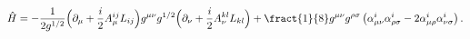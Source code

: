 \begin{equation}
\hat{H} = -\frac{1}{2g^{1/2}}\Bigl(\partial_{\mu} + \frac{i}{2}A^{ij}_{\mu}L_{ij}
\Bigr)g^{\mu\nu}g^{1/2}\Bigl(\partial_{\nu} + \frac{i}{2}A^{kl}_{\nu}L_{kl} \Bigr) +
\fract{1}{8}g^{\mu\nu}g^{\rho\sigma}\left( \alpha^i_{\mu\nu}\alpha^i_{\rho\sigma} -
2\alpha^i_{\mu\rho}\alpha^i_{\nu\sigma} \right) .
\label{2.16}
\end{equation}

